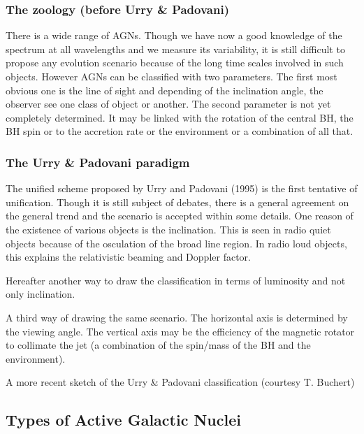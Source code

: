 \documentclass[10pt,a4paper,english]{article}
\begin{document}
\subsubsection{The zoology (before Urry \& Padovani)}

There is a wide range of AGNs. Though we have now a good knowledge of the
spectrum at all wavelengths and we measure its variability, it is still
difficult to propose any evolution scenario because of the long time scales
involved in such objects. However AGNs can be classified with two parameters.
The first most obvious one is the line of sight and depending of the
inclination angle, the observer see one class of object or another. The second
parameter is not yet completely determined. It may be linked with the rotation
of the central BH, the BH spin or to the accretion rate or the environment or a
combination of all that.


\subsubsection{The Urry \& Padovani paradigm}

The unified scheme proposed by Urry and Padovani (1995) is the first tentative
of unification. Though it is still subject of debates, there is a general
agreement on the general trend and the scenario is accepted within some
details. One reason of the existence of various objects is the inclination.
This is seen in radio quiet objects because of the osculation of the broad line
region. In radio loud objects, this explains the relativistic beaming and
Doppler factor.


Hereafter another way to draw the classification in terms of luminosity and not
only inclination.


A third way of drawing the same scenario. The horizontal axis is determined by
the viewing angle. The vertical axis may be the efficiency of the magnetic
rotator to collimate the jet (a combination of the spin/mass of the BH and the
environment).


A more recent sketch of the Urry \& Padovani classification (courtesy T.
Buchert)


\subsection{Types of Active Galactic Nuclei}
\end{document}
